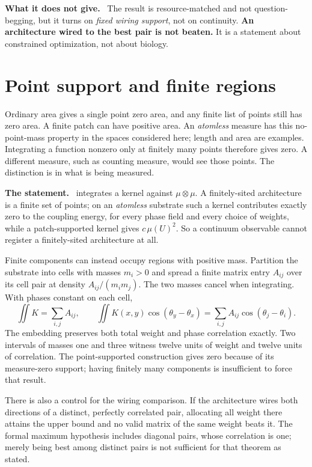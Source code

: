 \documentclass[11pt]{article}
\newcommand{\statement}{\par\smallskip\noindent\textbf{The statement.}\ }
\newcommand{\scope}{\par\smallskip\noindent\textbf{What it does not give.}\ }
\newcommand{\id}[1]{{\small\ttfamily\seqsplit{#1}}}
\begin{document}
\scope
The result is resource-matched and not question-begging, but it turns on
\emph{fixed wiring support}, not on continuity. \textbf{An architecture wired
to the best pair is not beaten.} It is a statement about constrained
optimization, not about biology.

\section{Point support and finite regions}
\label{sec:finite-regions}

Ordinary area gives a single point zero area, and any finite list of points
still has zero area. A finite patch can have positive area. An \emph{atomless}
measure has this no-point-mass property in the spaces considered here; length
and area are examples. Integrating a function nonzero only at finitely many
points therefore gives zero. A different measure, such as counting measure,
would see those points. The distinction is in what is being measured.

\statement
\id{fieldCorrelation} integrates a kernel against $\mu\otimes\mu$. A
finitely-sited architecture is a finite set of points; on an \emph{atomless}
substrate such a kernel contributes exactly zero to the coupling energy, for
every phase field and every choice of weights, while a patch-supported kernel
gives $c\,\mu(U)^2$. So a continuum observable cannot register a finitely-sited
architecture at all.

Finite components can instead occupy regions with positive mass. Partition the
substrate into cells with masses $m_i>0$ and spread a finite matrix entry $A_{ij}$
over its cell pair at density $A_{ij}/(m_i m_j)$. The two masses cancel when
integrating. With phases constant on each cell,
\[
 \iint K=\sum_{i,j}A_{ij},\qquad
 \iint K(x,y)\cos(\theta_y-\theta_x)
   =\sum_{i,j}A_{ij}\cos(\theta_j-\theta_i).
\]
The embedding preserves both total weight and phase correlation exactly.
Two intervals of masses one and three witness twelve units of weight and
twelve units of correlation. The point-supported construction gives zero
because of its measure-zero support; having finitely many components is
insufficient to force that result.

There is also a control for the wiring comparison. If the architecture wires
both directions of a distinct, perfectly correlated pair, allocating all
weight there attains the upper bound and no valid matrix of the same weight
beats it. The formal maximum hypothesis includes diagonal pairs, whose
correlation is one; merely being best among distinct pairs is not sufficient
for that theorem as stated.
\end{document}
